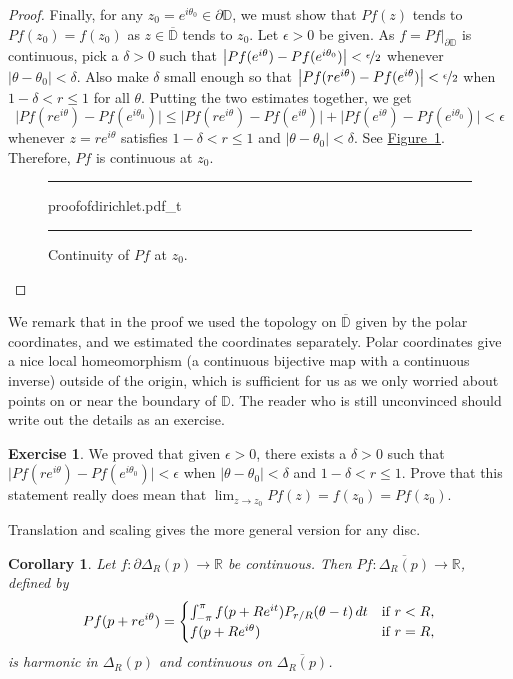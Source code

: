 \documentclass[12pt,openany]{book}
\newcommand{\avoidbreak}{\postdisplaypenalty=100}
\newcommand{\sabs}[1]{\lvert {#1} \rvert}
\newcommand{\babs}[1]{\bigl\lvert {#1} \bigr\rvert}
\newcommand{\R}{{\mathbb{R}}}
\newcommand{\D}{{\mathbb{D}}}
\theoremstyle{plain}
\newtheorem{cor}[thm]{Corollary}
\theoremstyle{remark}
\theoremstyle{definition}
\newenvironment{exbox}{%
    \def\FrameCommand{\vrule width 1pt \relax\hspace{10pt}}%
    \MakeFramed{\advance\hsize-\width\FrameRestore}%
}{%
    \endMakeFramed
}
\newenvironment{myfig}{%
\begin{figure}[h!t]
\noindent\rule{\textwidth}{0.5pt}\vspace{12pt}\par\centering}%
{\par\noindent\rule{\textwidth}{0.5pt}
\end{figure}}
\theoremstyle{exercise}
\newtheorem{exercise}{Exercise}[section]
\theoremstyle{example}
\newcommand{\figureref}[1]{\hyperref[#1]{Figure~\ref*{#1}}}
\begin{document}
\begin{proof}
Finally, for any $z_0 = e^{i\theta_0} \in \partial \D$,
we must show that
$Pf(z)$ tends to $Pf(z_0)=f(z_0)$ as $z \in \overline{\D}$ tends to $z_0$.
Let $\epsilon > 0$ be given.  As $f = Pf|_{\partial \D}$ is
continuous, pick a $\delta > 0$ such that
$\babs{Pf(e^{i\theta})-Pf(e^{i\theta_0})} < \nicefrac{\epsilon}{2}$
whenever $\sabs{\theta-\theta_0} < \delta$.
Also make $\delta$ small enough so that
$\babs{Pf(re^{i \theta})-Pf(e^{i\theta})} < \nicefrac{\epsilon}{2}$
when $1 - \delta < r \leq 1$ for all $\theta$.
Putting the two estimates together, we get
\begin{equation*}
\babs{Pf(re^{i\theta})-Pf(e^{i\theta_0})}
\leq
\babs{Pf(re^{i\theta})-Pf(e^{i\theta})}
+
\babs{Pf(e^{i\theta})-Pf(e^{i\theta_0})}
< \epsilon
\end{equation*}
whenever $z=re^{i\theta}$ satisfies $1 - \delta < r \leq 1$ and
$\sabs{\theta-\theta_0} < \delta$.
See \figureref{fig:proofofdirichlet}.
Therefore, $Pf$ is
continuous at $z_0$.
\begin{myfig}
{proofofdirichlet.pdf_t}
\caption{Continuity of $Pf$ at $z_0$.\label{fig:proofofdirichlet}}
\end{myfig}
\end{proof}

We remark that in the proof we used the topology on $\overline{\D}$
given by the polar coordinates, and we estimated the coordinates separately.
Polar coordinates give a nice local homeomorphism
(a continuous bijective map with a continuous inverse) outside of
the origin, which is sufficient for us as we only worried about points
on or near the boundary of $\D$.  The reader who is still unconvinced
should write out the details as an exercise.

\begin{exbox}
\begin{exercise}
We proved that given $\epsilon > 0$, there exists a $\delta > 0$ such that
$\babs{Pf(re^{i\theta})-Pf(e^{i\theta_0})} < \epsilon$
when $\sabs{\theta-\theta_0} < \delta$ and
$1 - \delta < r \leq 1$.  Prove that this statement really does mean that
$\lim_{z \to z_0} Pf(z) = f(z_0) = Pf(z_0)$.
\end{exercise}
\end{exbox}

Translation and scaling gives the more general version for
any disc.

\begin{cor} \label{cor:dirichsol}
Let $f \colon \partial \Delta_R(p) \to \R$ be continuous.
Then
$Pf \colon \overline{\Delta_R(p)} \to \R$, defined by
%
\begin{equation*}
Pf(p + re^{i\theta})
=
\begin{cases}
\int_{-\pi}^\pi f(p+Re^{it}) P_{r/R}(\theta-t) \, dt
&
\text{if $r < R$,} \\
f(p+Re^{i\theta}) & \text{if $r=R$,}
\end{cases}
\avoidbreak
\end{equation*}
is harmonic in $\Delta_R(p)$ and continuous on $\overline{\Delta_R(p)}$.
\end{cor}
\end{document}
